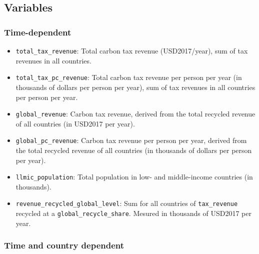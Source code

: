 \documentclass[
]{article}
\providecommand{\tightlist}{%
  \setlength{\itemsep}{0pt}\setlength{\parskip}{0pt}}
\begin{document}
\subsection{Variables}\label{variables-7}

\subsubsection{Time-dependent}\label{time-dependent-6}

\begin{itemize}
\tightlist
\item
  \texttt{total\_tax\_revenue}: Total carbon tax revenue (USD2017/year), sum
  of tax revenues in all countries.
\item
  \texttt{total\_tax\_pc\_revenue}: Total carbon tax revenue per person per year
  (in thousands of dollars per person per year), sum of tax revenues in all
  countries per person per year.
\item
  \texttt{global\_revenue}: Carbon tax revenue, derived from the total
  recycled revenue of all countries (in USD2017 per year).
\item
  \texttt{global\_pc\_revenue}: Carbon tax revenue per person per year, derived
  from the total recycled revenue of all countries (in thousands of
  dollars per person per year).
\item
  \texttt{llmic\_population}: Total population in low- and middle-income
  countries (in thousands).
  \item 
  \texttt{revenue\_recycled\_global\_level}: Sum for all countries of \texttt{tax\_revenue} recycled at a \texttt{global\_recycle\_share}. 
  Mesured in thousands of USD2017 per year.
\end{itemize}

\subsubsection{Time and country
dependent}\label{time-and-country-dependent-13}
\end{document}
